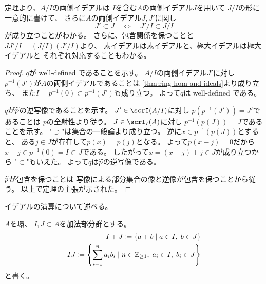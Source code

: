 \documentclass[report]{jlreq}
\begin{document}
\begin{remark}
    定理より、$A / I$の両側イデアルは
    $I$を含む$A$の両側イデアル$J$を用いて
    $J / I$の形に一意的に書けて、
    さらに$A$の両側イデアル$J, J'$に関し
    \begin{equation}
        J' \subset J
        \quad \iff \quad
        J' / I \subset J / I
    \end{equation}
    が成り立つことがわかる。
    さらに、包含関係を保つことと$JJ' / I = (J / I)(J' / I)$より、
    素イデアルは素イデアルと、極大イデアルは極大イデアルと
    それぞれ対応することもわかる。
\end{remark}

\begin{proof}
    $q$が well-defined であることを示す。
    $A / I$の両側イデアル$J'$に対し
    $p^{-1}(J')$が$A$の両側イデアルであることは
    \cref{thm:ring-hom-and-ideals}より成り立ち、
    また$I = p^{-1}(0) \subset p^{-1}(J')$も成り立つ。
    よって$q$は well-defined である。

    $q$が$\widetilde{p}$の逆写像であることを示す。
    $J' \in \scrI(A / I)$に対し
    $p(p^{-1}(J')) = J'$であることは
    $p$の全射性より従う。
    $J \in \scrI_I(A)$に対し
    $p^{-1}(p(J)) = J$であることを示す。
    "$\supset$"は集合の一般論より成り立つ。
    逆に$x \in p^{-1}(p(J))$とすると、
    ある$j \in J$が存在して$p(x) = p(j)$となる。
    よって$p(x - j) = 0$だから
    $x - j \in p^{-1}(0) = I \subset J$である。
    したがって$x = (x - j) + j \in J$が成り立つから
    "$\subset$"もいえた。
    よって$q$は$\widetilde{p}$の逆写像である。

    $\widetilde{p}$が包含を保つことは
    写像による部分集合の像と逆像が包含を保つことから従う。
    以上で定理の主張が示された。
\end{proof}

イデアルの演算について述べる。

\begin{definition}[加法部分群の和と積]
    $A$を環、
    $I, J \subset A$を加法部分群とする。
    \begin{alignat}{1}
        I + J \coloneqq \{ a + b
            \mid
            a \in I, \;
            b \in J
        \} \\
        IJ \coloneqq \left\{
            \sum_{i=1}^n a_i b_i
            \mid
            n \in \mathbb{Z}_{\ge 1}, \;
            a_i \in I, \;
            b_i \in J
        \right\}
    \end{alignat}
    と書く。
\end{definition}
\end{document}
